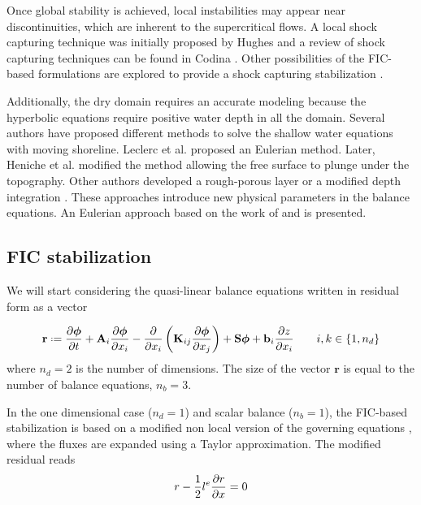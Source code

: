 Once global stability is achieved, local instabilities may appear near discontinuities, which are inherent to the supercritical flows.
A local shock capturing technique was initially proposed by Hughes \cite{hughes1986} and a review of shock capturing techniques can be found in Codina \cite{codina2011}.
Other possibilities of the FIC-based formulations are explored to provide a shock capturing stabilization \cite{cotela2016}.

Additionally, the dry domain requires an accurate modeling because the hyperbolic equations require positive water depth in all the domain.
Several authors have proposed different methods to solve the shallow water equations with moving shoreline. Leclerc et al. \cite{leclerc1990} proposed an Eulerian method. Later, Heniche et al. \cite{heniche2000} modified the method allowing the free surface to plunge under the topography.
Other authors developed a rough-porous layer \cite{candy2017,barros2011} or a modified depth integration \cite{defina2000}. These approaches introduce new physical parameters in the balance equations.
An Eulerian approach based on the work of \cite{leclerc1990} and \cite{heniche2000} is presented.




\subsection{FIC stabilization}
\label{sec:stabilization}

We will start considering the quasi-linear balance equations written in residual form as a vector

\begin{equation} \label{residual}
\mathbf{r} \defeq 
  \pder{\bm{\phi}}{t} + \mathbf{A}_i\pder{\bm{\phi}}{x_i}
  -\pder{}{x_i}\left(\mathbf{K}_{ij}\pder{\bm{\phi}}{x_j}\right) + \mathbf{S}\bm{\phi} + \mathbf{b}_i\pder{z}{x_i} \qquad i,k\in\{1,n_d\}
\end{equation}
where $n_d=2$ is the number of dimensions. The size of the vector $\mathbf{r}$ is equal to the number of balance equations, $n_b=3$.

In the one dimensional case ($n_d=1$) and scalar balance ($n_b=1$), the FIC-based stabilization is based on a modified non local version of the governing equations \cite{onate1998}, where the fluxes are expanded using a Taylor approximation. The modified residual reads
\begin{equation}
r - \frac{1}{2}l^e\frac{\partial r}{\partial x} = 0
\end{equation}

